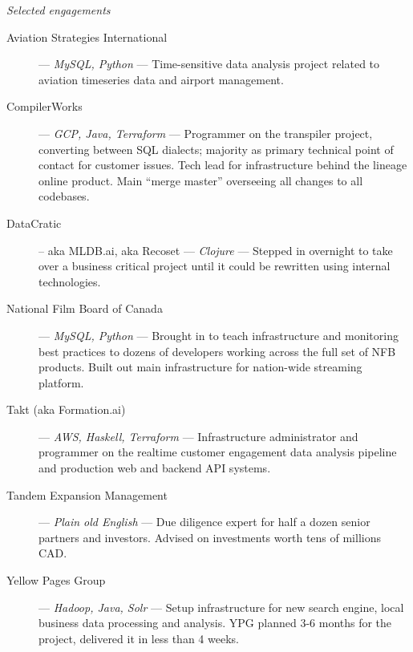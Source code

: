 \textit{\large Selected engagements}
\vspace{1 mm}
\begin{description}
\item[Aviation Strategies International] --- \textit{MySQL, Python} --- Time-sensitive data analysis project related to aviation timeseries data and airport management.
\vspace{1 mm}
\item[CompilerWorks] --- \textit{GCP, Java, Terraform} --- Programmer on the transpiler project, converting between SQL dialects; majority as primary technical point of contact for customer issues. Tech lead for infrastructure behind the lineage online product. Main ``merge master'' overseeing all changes to all codebases.
\vspace{1 mm}
\item[DataCratic] -- aka MLDB.ai, aka Recoset --- \textit{Clojure} --- Stepped in overnight to take over a business critical project until it could be rewritten using internal technologies.
\vspace{1 mm}
\item[National Film Board of Canada] --- \textit{MySQL, Python} --- Brought in to teach infrastructure and monitoring best practices to dozens of developers working across the full set of NFB products. Built out main infrastructure for nation-wide streaming platform.
\vspace{1 mm}
\item[Takt (aka Formation.ai)] --- \textit{AWS, Haskell, Terraform} --- Infrastructure administrator and programmer on the realtime customer engagement data analysis pipeline and production web and backend API systems.
\vspace{1 mm}
\item[Tandem Expansion Management] --- \textit{Plain old English} --- Due diligence expert for half a dozen senior partners and investors. Advised on investments worth tens of millions CAD.
\vspace{1 mm}
\item[Yellow Pages Group] --- \textit{Hadoop, Java, Solr} --- Setup infrastructure for new search engine, local business data processing and analysis. YPG planned 3-6 months for the project, delivered it in less than 4 weeks.
\end{description}

\pagebreak

